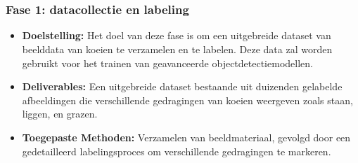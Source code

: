 
\chapter{}%
\label{ch:methodologie}


\subsection{Fase 1: datacollectie en labeling}
\begin{itemize}
    \item \textbf{Doelstelling:} Het doel van deze fase is om een uitgebreide dataset van beelddata van koeien te verzamelen en te labelen. Deze data zal worden gebruikt voor het trainen van geavanceerde objectdetectiemodellen.
    \item \textbf{Deliverables:} Een uitgebreide dataset bestaande uit duizenden gelabelde afbeeldingen die verschillende gedragingen van koeien weergeven zoals staan, liggen, en grazen.
    \item \textbf{Toegepaste Methoden:} Verzamelen van beeldmateriaal, gevolgd door een gedetailleerd labelingsproces om verschillende gedragingen te markeren.
\end{itemize}
